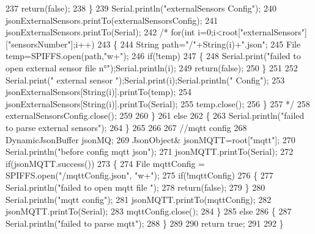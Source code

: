 \begin{DoxyCode}
237             \textcolor{keywordflow}{return}(\textcolor{keyword}{false});
238         \}
239         Serial.println(\textcolor{stringliteral}{"externalSensors Config"});
240         jsonExternalSensors.printTo(externalSensorsConfig);
241         jsonExternalSensors.printTo(Serial);
242 \textcolor{comment}{/*      for(int i=0;i<root["externalSensors"]["sensorsNumber"];i++)}
243 \textcolor{comment}{        \{   }
244 \textcolor{comment}{            String path="/"+String(i)+".json"; }
245 \textcolor{comment}{                File temp=SPIFFS.open(path,"w+");}
246 \textcolor{comment}{            if(!temp)}
247 \textcolor{comment}{            \{}
248 \textcolor{comment}{                Serial.print("failed to open  external sensor file n°");Serial.println(i);}
249 \textcolor{comment}{                return(false);}
250 \textcolor{comment}{            \}}
251 \textcolor{comment}{                }
252 \textcolor{comment}{            Serial.print(" external sensor ");Serial.print(i);Serial.println(" Config");}
253 \textcolor{comment}{            jsonExternalSensors[String(i)].printTo(temp);}
254 \textcolor{comment}{            jsonExternalSensors[String(i)].printTo(Serial);}
255 \textcolor{comment}{            temp.close();}
256 \textcolor{comment}{        \}}
257 \textcolor{comment}{*/}          
258         externalSensorsConfig.close();
259 
260     \}
261     \textcolor{keywordflow}{else}
262     \{
263         Serial.println(\textcolor{stringliteral}{"failed to parse external sensors"}); 
264     \}
265 
266     
267     \textcolor{comment}{//mqtt config}
268     DynamicJsonBuffer jsonMQ;
269         JsonObject& jsonMQTT=root[\textcolor{stringliteral}{"mqtt"}];
270     Serial.println(\textcolor{stringliteral}{"before config mqtt json"});
271     jsonMQTT.printTo(Serial);
272     \textcolor{keywordflow}{if}(jsonMQTT.success())
273     \{
274         File mqttConfig = SPIFFS.open(\textcolor{stringliteral}{"/mqttConfig.json"}, \textcolor{stringliteral}{"w+"});    
275         \textcolor{keywordflow}{if}(!mqttConfig)
276         \{
277             Serial.println(\textcolor{stringliteral}{"failed to open mqtt file "});        
278             \textcolor{keywordflow}{return}(\textcolor{keyword}{false});
279         \}
280         Serial.println(\textcolor{stringliteral}{"mqtt config"});
281         jsonMQTT.printTo(mqttConfig);
282         jsonMQTT.printTo(Serial);
283         mqttConfig.close();
284     \}
285     \textcolor{keywordflow}{else}
286     \{
287         Serial.println(\textcolor{stringliteral}{"failed to parse mqtt"}); 
288     \}   
289         
290     \textcolor{keywordflow}{return} \textcolor{keyword}{true};
291 
292 \}   
\end{DoxyCode}
